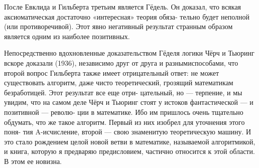 {{   После Евклида и Гильберта третьим является Гёдель. Он доказал,\linebreak
что всякая аксиоматическая достаточно «интересная» теория обяза-\linebreak
тельно будет неполной (или противоречивой). Этот явно негативный\linebreak
результат странным образом является одним из наиболее позитивных.\linebreak
   
\pagebreak
\restoretop
{}
\noindent
Непосредственно вдохновленные доказательством Гёделя логики Чёрч\linebreak
и Тьюринг вскоре доказали (1936), независимо друг от друга и разными\linebreak способами, что второй вопрос Гильберта также имеет отрицательный\linebreak
ответ: не может существовать алгоритм, даже чисто теоретический,\linebreak
грозящий математикам безработицей. Этот результат все еще отри-\linebreak
цательный, но — терпение, и мы увидим, что на самом деле Чёрч и\linebreak
Тьюринг стоят у истоков фантастической — и позитивной — револю-\linebreak
ции в математике. Ибо им пришлось очень тщательно обдумать, что\linebreak
же такое алгоритм. Первый из них изобрел для уточнения этого поня-\linebreak
тия A-исчисление, второй — свою знаменитую теоретическую машину.\linebreak
И это стало рождением целой новой ветви в математике, называемой\linebreak
алгоритмикой, и книга, которую я предваряю предисловием, частично\linebreak
относится к этой области. В этом ее новизна.

}}
